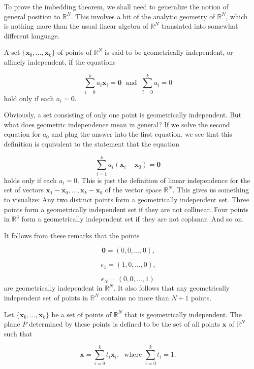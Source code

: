 To prove the imbedding theorem, we shall need to generalize the notion of general position to \(\mathbb{R}^{N}\). This involves a bit of the analytic geometry of \(\mathbb{R}^{N}\), which is nothing more than the usual linear algebra of \(\mathbb{R}^{N}\) translated into somewhat different language.

\begin{definition}
A set \(\{ {\mathbf{x}_{0},\ldots ,\mathbf{x}_{k}}\}\) of points of \(\mathbb{R}^{N}\) is said to be geometrically independent, or affinely independent, if the equations

\[
\mathop{\sum }\limits_{{i = 0}}^{k}a_{i}\mathbf{x}_{i} = \mathbf{0}\;\text{ and }\;\mathop{\sum }\limits_{{i = 0}}^{k}a_{i} = 0
\]
hold only if each \(a_{i} = 0\).
\end{definition}

Obviously, a set consisting of only one point is geometrically independent. But what does geometric independence mean in general? If we solve the second equation for \(a_{0}\) and plug the answer into the first equation, we see that this definition is equivalent to the statement that the equation

\[
\mathop{\sum }\limits_{{i = 1}}^{k}a_{i}({\mathbf{x}_{i} - \mathbf{x}_{0}}) = \mathbf{0}
\]
holds only if each \(a_{i} = 0\). This is just the definition of linear independence for the set of vectors \(\mathbf{x}_{1} - \mathbf{x}_{0},\ldots ,\mathbf{x}_{k} - \mathbf{x}_{0}\) of the vector space \(\mathbb{R}^{N}\). This gives us something to visualize: Any two distinct points form a geometrically independent set. Three points form a geometrically independent set if they are not collinear. Four points in \(\mathbb{R}^{3}\) form a geometrically independent set if they are not coplanar. And so on.

It follows from these remarks that the points

\[
\mathbf{0} = ({0,0,\ldots, 0}) \text{,}
\]

\[
{\epsilon }_{1} = ({1,0,\ldots, 0}) \text{,}
\]

\[
{\epsilon }_{N} = ({0,0,\ldots, 1})
\]
are geometrically independent in \(\mathbb{R}^{N}\). It also follows that any geometrically independent set of points in \(\mathbb{R}^{N}\) contains no more than \(N + 1\) points.

\begin{definition}
Let \(\{ {\mathbf{x}_{0},\ldots ,\mathbf{x}_{k}}\}\) be a set of points of \(\mathbb{R}^{N}\) that is geometrically independent. The plane \(P\) determined by these points is defined to be the set of all points \(\mathbf{x}\) of \(\mathbb{R}^{N}\) such that

\[
\mathbf{x} = \mathop{\sum }\limits_{{i = 0}}^{k}t_{i}\mathbf{x}_{i},\;\text{ where }\mathop{\sum }\limits_{{i = 0}}^{k}t_{i} = 1.
\]
\end{definition}

